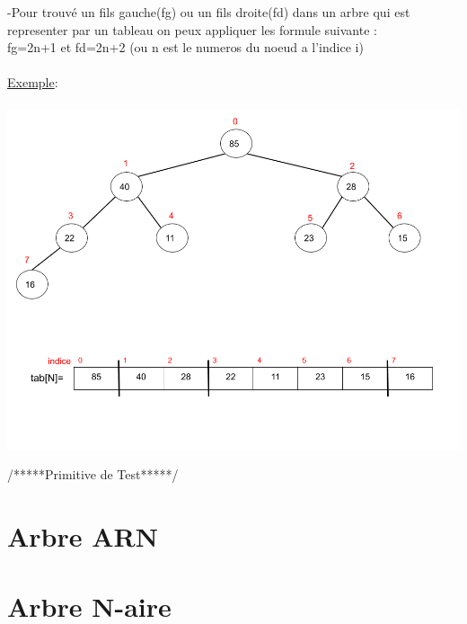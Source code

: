 \documentclass[a4paper,12pt,openany]{book}
\begin{document}
-Pour trouvé un fils gauche(fg) ou un fils droite(fd) dans un arbre qui est representer par un tableau on peux appliquer les formule suivante :\\
fg=2n+1 et fd=2n+2 (ou n est le numeros du noeud a l'indice i)\\
\\
\underline{Exemple}:\\
\\
\includegraphics[width=1\linewidth,center]{img/arbre_impl_tab.png}


/*****Primitive de Test*****/




\chapter{Arbre ARN}


\chapter{Arbre N-aire}
\end{document}
